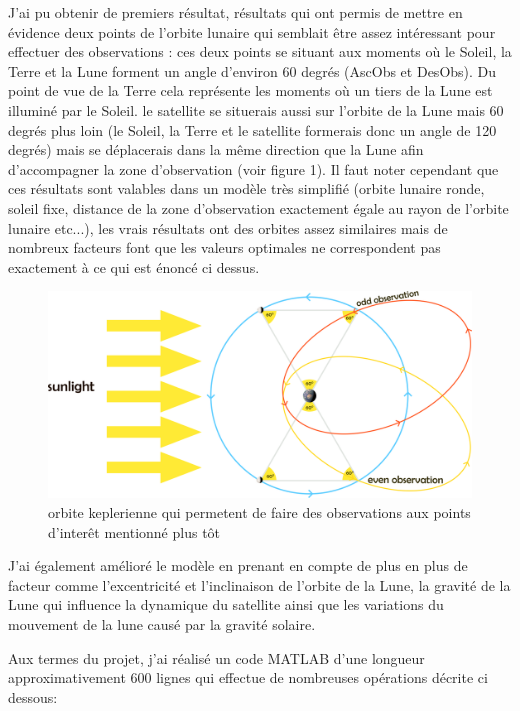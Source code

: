 \documentclass{article} %
\begin{document}
		J'ai pu obtenir de premiers résultat, résultats qui ont permis de mettre en évidence deux points de l'orbite lunaire qui semblait être assez intéressant pour effectuer des observations : ces deux points se situant aux moments où le Soleil, la Terre et la Lune forment un angle d'environ 60 degrés (\gls{AscObs} et \gls{DesObs}). Du point de vue de la Terre cela représente les moments où un tiers de la Lune est illuminé par le Soleil. le satellite se situerais aussi sur l'orbite de la Lune mais 60 degrés plus loin (le Soleil, la Terre et le satellite formerais donc un angle de 120 degrés) mais se déplacerais dans la même direction que la Lune afin d'accompagner la zone d'observation (voir figure 1). Il faut noter cependant que ces résultats sont valables dans un modèle très simplifié (orbite lunaire ronde, soleil fixe, distance de la zone d'observation exactement égale au rayon de l'orbite lunaire etc...), les vrais résultats ont des orbites assez similaires mais de nombreux facteurs font que les valeurs optimales ne correspondent pas exactement à ce qui est énoncé ci dessus.
		
		
		\begin{figure}[h]
			\includegraphics[width=18cm]{images/observations_main.png}
			\caption{orbite keplerienne qui permetent de faire des observations aux points d'interêt mentionné plus tôt}
		\end{figure}
		
		
		J'ai également amélioré le modèle en prenant en compte de plus en plus de facteur comme l'excentricité et l'inclinaison de l'orbite de la Lune, la gravité de la Lune qui influence la dynamique du satellite ainsi que les variations du mouvement de la lune causé par la gravité solaire.
		
		Aux termes du projet, j'ai réalisé un code MATLAB d'une longueur approximativement 600 lignes qui effectue de nombreuses opérations décrite ci dessous: 
		
\end{document}
